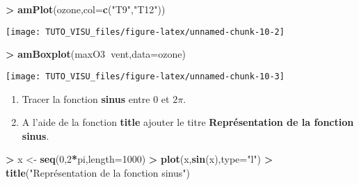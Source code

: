 \documentclass[]{book}
\newenvironment{Shaded}{\begin{snugshade}}{\end{snugshade}}
\newcommand{\DataTypeTok}[1]{\textcolor[rgb]{0.13,0.29,0.53}{#1}}
\newcommand{\DecValTok}[1]{\textcolor[rgb]{0.00,0.00,0.81}{#1}}
\newcommand{\KeywordTok}[1]{\textcolor[rgb]{0.13,0.29,0.53}{\textbf{#1}}}
\newcommand{\NormalTok}[1]{#1}
\newcommand{\OperatorTok}[1]{\textcolor[rgb]{0.81,0.36,0.00}{\textbf{#1}}}
\newcommand{\StringTok}[1]{\textcolor[rgb]{0.31,0.60,0.02}{#1}}
\providecommand{\tightlist}{%
  \setlength{\itemsep}{0pt}\setlength{\parskip}{0pt}}
\theoremstyle{definition}
\theoremstyle{definition}
\theoremstyle{definition}
\theoremstyle{remark}
\let\BeginKnitrBlock\begin \let\EndKnitrBlock\end
\begin{document}
\begin{Shaded}
\begin{Highlighting}[]
\OperatorTok{>}\StringTok{ }\KeywordTok{amPlot}\NormalTok{(ozone,}\DataTypeTok{col=}\KeywordTok{c}\NormalTok{(}\StringTok{"T9"}\NormalTok{,}\StringTok{"T12"}\NormalTok{))}
\end{Highlighting}
\end{Shaded}

\begin{center}\texttt{[image: TUTO\_VISU\_files/figure-latex/unnamed-chunk-10-2]} \end{center}

\begin{Shaded}
\begin{Highlighting}[]
\OperatorTok{>}\StringTok{ }\KeywordTok{amBoxplot}\NormalTok{(maxO3}\OperatorTok{~}\NormalTok{vent,}\DataTypeTok{data=}\NormalTok{ozone)}
\end{Highlighting}
\end{Shaded}

\begin{center}\texttt{[image: TUTO\_VISU\_files/figure-latex/unnamed-chunk-10-3]} \end{center}

\BeginKnitrBlock{exercise}[Premier graphe]
\protect\hypertarget{exr:exo1}{}{\label{exr:exo1} \iffalse (Premier graphe) \fi{} }
\EndKnitrBlock{exercise}

\begin{enumerate}
\def\labelenumi{\arabic{enumi}.}
\tightlist
\item
  Tracer la fonction \textbf{sinus} entre \(0\) et \(2\pi\).
\item
  A l'aide de la fonction \textbf{title} ajouter le titre \textbf{Représentation de la fonction sinus}.
\end{enumerate}

\begin{Shaded}
\begin{Highlighting}[]
\OperatorTok{>}\StringTok{ }\NormalTok{x <-}\StringTok{ }\KeywordTok{seq}\NormalTok{(}\DecValTok{0}\NormalTok{,}\DecValTok{2}\OperatorTok{*}\NormalTok{pi,}\DataTypeTok{length=}\DecValTok{1000}\NormalTok{)}
\OperatorTok{>}\StringTok{ }\KeywordTok{plot}\NormalTok{(x,}\KeywordTok{sin}\NormalTok{(x),}\DataTypeTok{type=}\StringTok{"l"}\NormalTok{)}
\OperatorTok{>}\StringTok{ }\KeywordTok{title}\NormalTok{(}\StringTok{"Représentation de la fonction sinus"}\NormalTok{)}
\end{Highlighting}
\end{Shaded}
\end{document}
